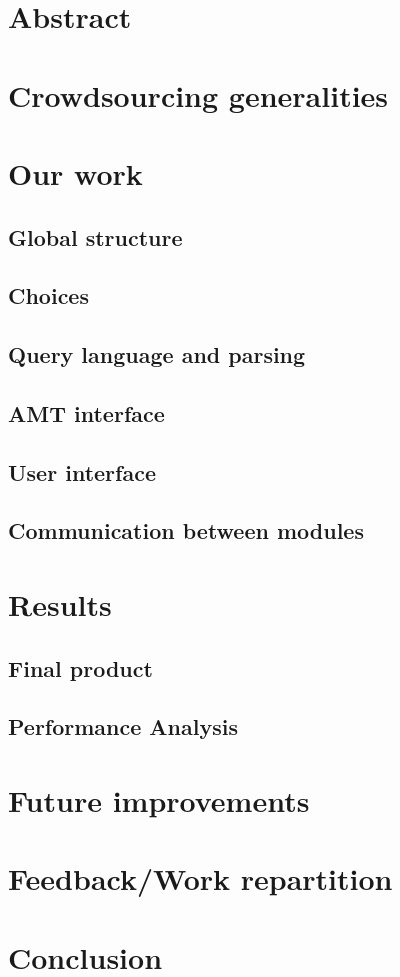 \documentclass{article}
\begin{document}


\tableofcontents
\newpage

\section{Abstract}

\section{Crowdsourcing generalities}



\section{Our work} %
\subsection{Global structure}
\subsection{Choices}
\subsection{Query language and parsing}
\subsection{AMT interface}
\subsection{User interface}
\subsection{Communication between modules} 

\section{Results}
\subsection{Final product}
\subsection{Performance Analysis}

\section{Future improvements} %

\section{Feedback/Work repartition} %
\section{Conclusion}
\end{document}
